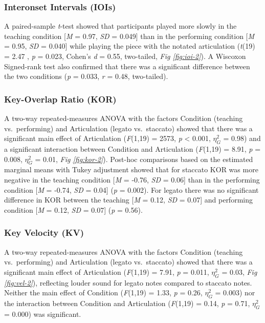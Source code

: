 \documentclass[
  english,
  man,floatsintext]{apa6}
\begin{document}
\hypertarget{interonset-intervals-iois-2}{%
\subsubsection{Interonset Intervals (IOIs)}\label{interonset-intervals-iois-2}}

A paired-sample \emph{t}-test showed that participants played more slowly in the teaching condition {[}\emph{M} = 0.97, \emph{SD} = 0.049{]} than in the performing condition {[}\emph{M} = 0.95, \emph{SD} = 0.040{]} while playing the piece with the notated articulation (\emph{t}(19) = 2.47
, \emph{p} = 0.023, Cohen's \emph{d} = 0.55, two-tailed, \emph{Fig \ref{fig:ioi-2}}). A Wiscoxon Signed-rank test also confirmed that there was a significant difference between the two conditions (\emph{p} = 0.033, \emph{r} = 0.48, two-tailed).

\hypertarget{key-overlap-ratio-kor}{%
\subsubsection{Key-Overlap Ratio (KOR)}\label{key-overlap-ratio-kor}}

A two-way repeated-measures ANOVA with the factors Condition (teaching vs.~performing) and Articulation (legato vs.~staccato) showed that there was a significant main effect of Articulation (\emph{F}(1,19) = 2573, \emph{p} \textless{} 0.001, \(\eta_G^2\) = 0.98) and a significant interaction between Condition and Articulation (\emph{F}(1,19) = 8.91, \emph{p} = 0.008, \(\eta_G^2\) = 0.01, \emph{Fig \ref{fig:kor-2}}). Post-hoc comparisons based on the estimated marginal means with Tukey adjustment showed that for staccato KOR was more negative in the teaching condition {[}\emph{M} = -0.76, \emph{SD} = 0.06{]} than in the performing condition {[}\emph{M} = -0.74, \emph{SD} = 0.04{]} (\emph{p} = 0.002). For legato there was no significant difference in KOR between the teaching {[}\emph{M} = 0.12, \emph{SD} = 0.07{]} and performing condition {[}\emph{M} = 0.12, \emph{SD} = 0.07{]} (\emph{p} = 0.56).

\hypertarget{key-velocity-kv-2}{%
\subsubsection{Key Velocity (KV)}\label{key-velocity-kv-2}}

A two-way repeated-measures ANOVA with the factors Condition (teaching vs.~performing) and Articulation (legato vs.~staccato) showed that there was a significant main effect of Articulation (\emph{F}(1,19) = 7.91, \emph{p} = 0.011, \(\eta_G^2\) = 0.03, \emph{Fig \ref{fig:vel-2}}), reflecting louder sound for legato notes compared to staccato notes. Neither the main effect of Condition (\emph{F}(1,19) = 1.33, \emph{p} = 0.26, \(\eta_G^2\) = 0.003) nor the interaction between Condition and Articulation (\emph{F}(1,19) = 0.14, \emph{p} = 0.71, \(\eta_G^2\) = 0.000) was significant.
\end{document}
